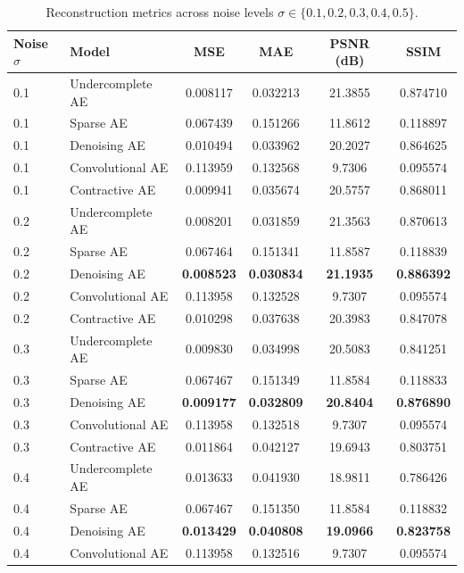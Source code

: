 \documentclass[12pt, a4paper]{article}
\begin{document}
\begin{table}[htbp]
\centering
\caption{Reconstruction metrics across noise levels $\sigma \in \{0.1, 0.2, 0.3, 0.4, 0.5\}$.}
\label{tab:noise_sweep}
\scriptsize
\begin{tabularx}{\textwidth}{llcccc}
\toprule
\textbf{Noise $\sigma$} & \textbf{Model} & \textbf{MSE} & \textbf{MAE} & \textbf{PSNR (dB)} & \textbf{SSIM} \\
\midrule
0.1 & Undercomplete AE & 0.008117 & 0.032213 & 21.3855 & 0.874710 \\
0.1 & Sparse AE        & 0.067439 & 0.151266 & 11.8612 & 0.118897 \\
0.1 & Denoising AE     & 0.010494 & 0.033962 & 20.2027 & 0.864625 \\
0.1 & Convolutional AE & 0.113959 & 0.132568 & 9.7306  & 0.095574 \\
0.1 & Contractive AE   & 0.009941 & 0.035674 & 20.5757 & 0.868011 \\
\midrule
0.2 & Undercomplete AE & 0.008201 & 0.031859 & 21.3563 & 0.870613 \\
0.2 & Sparse AE        & 0.067464 & 0.151341 & 11.8587 & 0.118839 \\
0.2 & Denoising AE     & \textbf{0.008523} & \textbf{0.030834} & \textbf{21.1935} & \textbf{0.886392} \\
0.2 & Convolutional AE & 0.113958 & 0.132528 & 9.7307  & 0.095574 \\
0.2 & Contractive AE   & 0.010298 & 0.037638 & 20.3983 & 0.847078 \\
\midrule
0.3 & Undercomplete AE & 0.009830 & 0.034998 & 20.5083 & 0.841251 \\
0.3 & Sparse AE        & 0.067467 & 0.151349 & 11.8584 & 0.118833 \\
0.3 & Denoising AE     & \textbf{0.009177} & \textbf{0.032809} & \textbf{20.8404} & \textbf{0.876890} \\
0.3 & Convolutional AE & 0.113958 & 0.132518 & 9.7307  & 0.095574 \\
0.3 & Contractive AE   & 0.011864 & 0.042127 & 19.6943 & 0.803751 \\
\midrule
0.4 & Undercomplete AE & 0.013633 & 0.041930 & 18.9811 & 0.786426 \\
0.4 & Sparse AE        & 0.067467 & 0.151350 & 11.8584 & 0.118832 \\
0.4 & Denoising AE     & \textbf{0.013429} & \textbf{0.040808} & \textbf{19.0966} & \textbf{0.823758} \\
0.4 & Convolutional AE & 0.113958 & 0.132516 & 9.7307  & 0.095574 \\

\end{tabularx}
\end{table}
\end{document}
